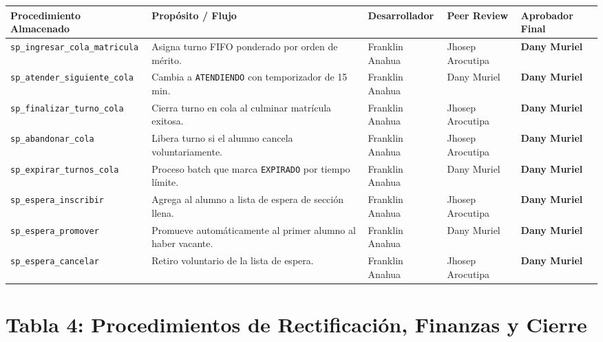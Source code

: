 \documentclass[11pt,a4paper]{article}
\begin{document}
\begin{longtable}{p{4.5cm} p{3.7cm} p{2.2cm} p{2.4cm} p{2.2cm}}
\toprule
\textbf{Procedimiento Almacenado} & \textbf{Propósito / Flujo} & \textbf{Desarrollador} & \textbf{Peer Review} & \textbf{Aprobador Final} \\
\midrule
\endhead
\texttt{sp\_ingresar\_cola\_matricula} & Asigna turno FIFO ponderado por orden de mérito. & Franklin Anahua & Jhosep Arocutipa & \textbf{Dany Muriel} \\
\rowcolor{rowgray}
\texttt{sp\_atender\_siguiente\_cola} & Cambia a \texttt{ATENDIENDO} con temporizador de 15 min. & Franklin Anahua & Dany Muriel & \textbf{Dany Muriel} \\
\texttt{sp\_finalizar\_turno\_cola} & Cierra turno en cola al culminar matrícula exitosa. & Franklin Anahua & Jhosep Arocutipa & \textbf{Dany Muriel} \\
\rowcolor{rowgray}
\texttt{sp\_abandonar\_cola} & Libera turno si el alumno cancela voluntariamente. & Franklin Anahua & Jhosep Arocutipa & \textbf{Dany Muriel} \\
\texttt{sp\_expirar\_turnos\_cola} & Proceso batch que marca \texttt{EXPIRADO} por tiempo límite. & Franklin Anahua & Dany Muriel & \textbf{Dany Muriel} \\
\rowcolor{rowgray}
\texttt{sp\_espera\_inscribir} & Agrega al alumno a lista de espera de sección llena. & Franklin Anahua & Jhosep Arocutipa & \textbf{Dany Muriel} \\
\texttt{sp\_espera\_promover} & Promueve automáticamente al primer alumno al haber vacante. & Franklin Anahua & Dany Muriel & \textbf{Dany Muriel} \\
\rowcolor{rowgray}
\texttt{sp\_espera\_cancelar} & Retiro voluntario de la lista de espera. & Franklin Anahua & Jhosep Arocutipa & \textbf{Dany Muriel} \\
\bottomrule
\end{longtable}

\vspace{0.5cm}

\section{Tabla 4: Procedimientos de Rectificación, Finanzas y Cierre}
\end{document}
